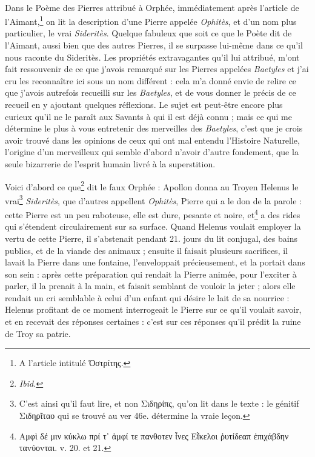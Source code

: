 \documentclass[a4paper, 11pt, oneside, polutonikogreek, french]{article}
\begin{document}
\paragraph{}
Dans le Poème des Pierres attribué à Orphée, immédiatement après l'article de l'Aimant,\footnote{A l'article intitulé Ὀστρίτης.} on lit la description d'une Pierre appelée \emph{Ophitès}, et d'un nom plus particulier, le vrai \emph{Sideritès}. Quelque fabuleux que soit ce que le Poète dit de l'Aimant, aussi bien que des autres Pierres, il se surpasse lui-même dans ce qu'il nous raconte du Sideritès. Les propriétés extravagantes qu'il lui attribué, m'ont fait ressouvenir de ce que j'avois remarqué sur les Pierres appelées \emph{Baetyles} et j'ai cru les reconnaître ici sous un nom différent : cela m'a donné envie de relire ce que j'avois autrefois recueilli sur les \emph{Baetyles}, et de vous donner le précis de ce recueil en y ajoutant quelques réflexions. Le sujet est peut-être encore plus curieux qu'il ne le paraît aux Savants à qui il est déjà connu ; mais ce qui me détermine le plus à vous entretenir des merveilles des \emph{Baetyles}, c'est que je crois avoir trouvé dans les opinions de ceux qui ont mal entendu l'Histoire Naturelle, l'origine d'un merveilleux qui semble d'abord n'avoir d'autre fondement, que la seule bizarrerie de l'esprit humain livré à la superstition.

Voici d'abord ce que\footnote{\emph{Ibid.}} dit le faux Orphée : Apollon donna au Troyen Helenus le vrai\footnote{C'est ainsi qu'il faut lire, et non Σιδηρίπς, qu'on lit dans le texte : le génitif Σιδηρῖταο qui se trouvé au ver 46e. détermine la vraie leçon.} \emph{Sideritès}, que d'autres appellent \emph{Ophitès}, Pierre qui a le don de la parole : cette Pierre est un peu raboteuse, elle est dure, pesante et noire, et\footnote{Αμφὶ δέ μιν κύκλω πρί τ᾽ ἀμφί τε πανθοτεν ἶνες Εῗκελοι ῥυτίδεαπ ἐπιχάβδην ταvύοvται. v. 20. et 21.} a des rides qui s'étendent circulairement sur sa surface. Quand Helenus voulait employer la vertu de cette Pierre, il s'abstenait pendant 21. jours du lit conjugal, des bains publics, et de la viande des animaux ; ensuite il faisait plusieurs sacrifices, il lavait la Pierre dans une fontaine, l'enveloppait précieusement, et la portait dans son sein : après cette préparation qui rendait la Pierre animée, pour l'exciter à parler, il la prenait à la main, et faisait semblant de vouloir la jeter ; alors elle rendait un cri semblable à celui d'un enfant qui désire le lait de sa nourrice : Helenus profitant de ce moment interrogeait le Pierre sur ce qu'il voulait savoir, et en recevait des réponses certaines : c'est sur ces réponses qu'il prédit la ruine de Troy sa patrie.
\end{document}

